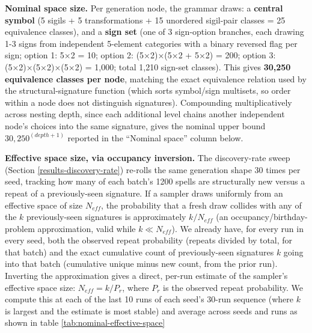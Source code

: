 \documentclass[]{article}
\begin{document}
        \textbf{Nominal space size.} Per generation node, the grammar draws: a \textbf{central symbol} (5 sigils + 5 transformations + 15 unordered sigil-pair classes = 25 equivalence classes), and a \textbf{sign set} (one of 3 sign-option branches, each drawing 1-3 signs from independent 5-element categories with a binary reversed flag per sign; option 1: 5×2 = 10; option 2: (5×2)×(5×2 + 5×2) = 200; option 3: (5×2)×(5×2)×(5×2) = 1,000; total 1,210 sign-set classes). This gives \textbf{30,250 equivalence classes per node}, matching the exact equivalence relation used by the structural-signature function (which sorts symbol/sign multisets, so order within a node does not distinguish signatures). Compounding multiplicatively across nesting depth, since each additional level chains another independent node's choices into the same signature, gives the nominal upper bound $30,250^{(depth+1)}$ reported in the ``Nominal space'' column below.
        
        \textbf{Effective space size, via occupancy inversion.} The discovery-rate sweep (Section \ref{results-discovery-rate}) re-rolls the same generation shape 30 times per seed, tracking how many of each batch's 1200 spells are structurally new versus a repeat of a previously-seen signature. If a sampler draws uniformly from an effective space of size $N_{eff}$, the probability that a fresh draw collides with any of the $k$ previously-seen signatures is approximately $k / N_{eff}$ (an occupancy/birthday-problem approximation, valid while $k \ll N_{eff}$). We already have, for every run in every seed, both the observed repeat probability (repeats divided by total, for that batch) and the exact cumulative count of previously-seen signatures $k$ going into that batch (cumulative unique minus new count, from the prior run). Inverting the approximation gives a direct, per-run estimate of the sampler's effective space size: $N_{eff} = k / P_r$, where $P_r$ is the observed repeat probability. We compute this at each of the last 10 runs of each seed's 30-run sequence (where $k$ is largest and the estimate is most stable) and average across seeds and runs as shown in table \ref{tab:nominal-effective-space}
\end{document}
